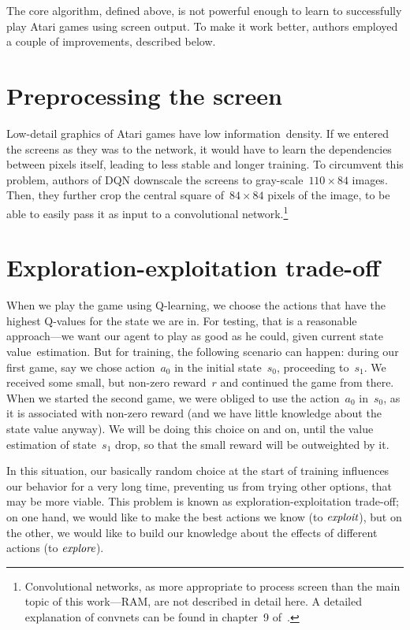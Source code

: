 The core algorithm, defined above, is not powerful enough to learn to successfully play Atari games using screen output. To make it work better, authors employed a couple of improvements, described below.

\section{Preprocessing the screen}
Low-detail graphics of Atari games have low information~density. If we entered the screens as they was to the network, it would have to learn the dependencies between pixels itself, leading to less stable and longer training. To circumvent this problem, authors of DQN downscale the screens to gray-scale~$110 \times 84$ images. Then, they further crop the central square of~$84 \times 84$ pixels of the image, to be able to easily pass it as input to a convolutional network.\footnote{Convolutional networks, as more appropriate to process screen than the main topic of this work---RAM, are not described in detail here. A detailed explanation of convnets can be found in chapter~9 of~\cite{dlbook}.}

\section{Exploration-exploitation trade-off}
When we play the game using Q-learning, we choose the actions that have the highest Q-values for the state we are in. For testing, that is a reasonable approach---we want our agent to play as good as he could, given current state value~estimation. But for training, the following scenario can happen: during our first game, say we chose action~$a_0$ in the initial state~$s_0$, proceeding to~$s_1$. We received some small, but non-zero reward~$r$ and continued the game from there. When we started the second game, we were obliged to use the action~$a_0$ in~$s_0$, as it is associated with non-zero reward (and we have little knowledge about the state value anyway). We will be doing this choice on and on, until the value estimation of state~$s_1$ drop, so that the small reward will be outweighted by it.

In this situation, our basically random choice at the start of training influences our behavior for a very long time, preventing us from trying other options, that may be more viable. This problem is known as exploration-exploitation trade-off; on one hand, we would like to make the best actions we know (to $\emph{exploit}$), but on the other, we would like to build our knowledge about the effects of different actions (to $\emph{explore}$).

